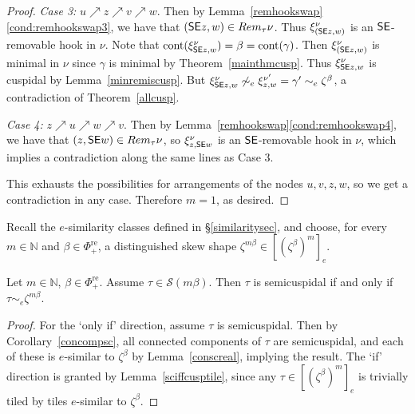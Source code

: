 \documentclass[Unicode,ALCO]{cedram}
\newcommand{\SSSS}{\mathcal{S}}
\newcommand{\0}{{\bar 0}}
\newcommand{\NN}{{\mathbb N}}
\newcommand{\ssee}{{\sf SE}}
\def\cont{{\operatorname{cont}}}
\def\re{{\mathrm{re}}}
\begin{document}
\begin{proof}
{\em Case 3:} \(u \nearrow z \nearrow v \nearrow w\). Then by Lemma~\ref{remhookswap}\eqref{cond:remhookswap3}, we have that \((\ssee z,w) \in \textup{Rem}_\tau\nu\). Thus \(\xi^\nu_{(\ssee z, w)}\) is an \(\ssee\)-removable hook in \(\nu\). Note that \(\cont(\xi^\nu_{\ssee z, w}) = \beta = \cont(\gamma)\). Then \(\xi^\nu_{(\ssee z, w)}\) is minimal in \(\nu\) since \(\gamma\) is minimal by Theorem~\ref{mainthmcusp}. Thus \(\xi^\nu_{\ssee z, w}\) is cuspidal by Lemma~\ref{minremiscusp}. But \(\xi^\nu_{\ssee z, w} \not \sim_e \xi^{\nu'}_{z,w}  = \gamma' \sim_e \zeta^\beta\), a contradiction of Theorem~\ref{allcusp}.

{\em Case 4:} \(z \nearrow u \nearrow w \nearrow v\).  Then by Lemma~\ref{remhookswap}\eqref{cond:remhookswap4}, we have that \((z, \ssee w) \in \textup{Rem}_\tau\nu\), so \(\xi^\nu_{z, \ssee w}\) is an \(\ssee\)-removable hook in \(\nu\), which implies a contradiction along the same lines as Case 3. 

This exhausts the possibilities for arrangements of the nodes \(u,v,z,w\), so we get a contradiction in any case. Therefore \(m=1\), as desired.
\end{proof}



Recall the \(e\)-similarity classes defined in \S\ref{similaritysec}, and choose, for every \(m \in \NN\) and \(\beta \in \Phi_+^\re\), a distinguished skew shape \(\zeta^{m \beta} \in [(\zeta^\beta)^m]_e\).

\begin{coro}\label{realsemicor}
Let \(m \in \NN\), \(\beta \in \Phi_+^\re\). Assume \(\tau \in \SSSS(m\beta)\). 
Then \(\tau\) is semicuspidal if and only if \(\tau \sim_e \zeta^{m \beta}\). 
\end{coro}
\begin{proof}
For the `only if' direction, assume \(\tau\) is semicuspidal. Then by Corollary~\ref{concompsc}, all connected components of \(\tau\) are semicuspidal, and each of these is \(e\)-similar to \(\zeta^\beta\) by Lemma~\ref{conscreal}, implying the result. 
The `if' direction is granted by Lemma~\ref{sciffcusptile}, since any \(\tau \in [(\zeta^\beta)^m]_e\) is trivially tiled by tiles \(e\)-similar to \(\zeta^\beta\).
\end{proof}
\end{document}
